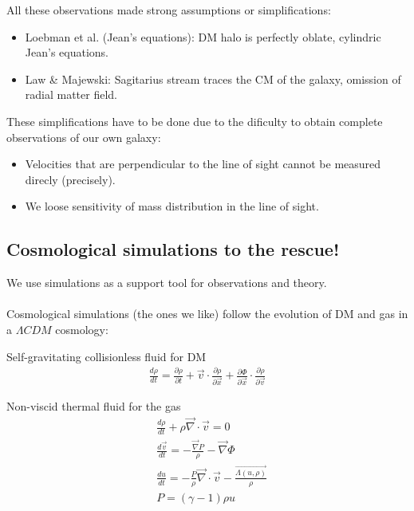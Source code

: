 \documentclass[xcolor=dvipsnames]{beamer}
\begin{document}
\begin{frame}
All these observations made strong assumptions or simplifications:

\begin{itemize}
\item Loebman et al. (Jean's equations): DM halo is perfectly oblate, cylindric Jean's equations.

\item Law \& Majewski: Sagitarius stream traces the CM of the galaxy, omission of radial matter field.
\end{itemize}

These simplifications have to be done due to the dificulty to obtain complete observations of our own galaxy:

\begin{itemize}
\item Velocities that are perpendicular to the line of sight cannot be measured direcly (precisely).

\item We loose sensitivity of mass distribution in the line of sight.
\end{itemize}

\end{frame}

\subsection{Cosmological simulations to the rescue!}

\begin{frame}

We use simulations as a support tool for observations and theory.\\~\\

Cosmological simulations (the ones we like) follow the evolution of DM and gas in a $\Lambda CDM$ cosmology:

\begin{block}{Self-gravitating collisionless fluid for DM}
\tiny
\begin{align}
\frac{d\rho}{dt} = \frac{\partial \rho}{\partial t} +\vec{v}\cdot\frac{\partial\rho}{\partial \vec{x}}
+\frac{\partial \Phi}{\partial \vec{x}}\cdot\frac{\partial\rho}{\partial \vec{v}}
\end{align}
\end{block}

\begin{block}{Non-viscid thermal fluid for the gas}
\tiny
\begin{align}
&\frac{d\rho}{dt} + \rho \vec{\nabla}\cdot\vec{v} = 0\\
&\frac{d\vec{v}}{dt} = -\frac{\vec{\nabla}P}{\rho} - \vec{\nabla} \Phi \\
&\frac{du}{dt} = -\frac{P}{\rho}\vec{\nabla}\cdot\vec{v} - \frac{\vec{\Lambda(u,\rho)}}{\rho}\\
& P = (\gamma -1 )\rho u
\end{align}
\end{block}
\end{frame}
\end{document}
